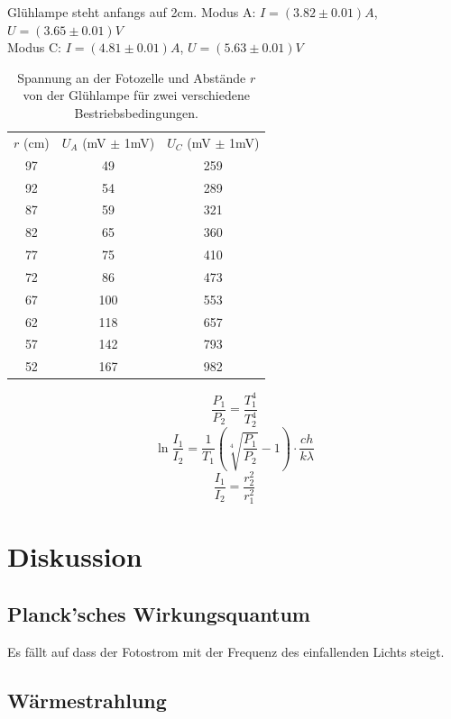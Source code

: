 \documentclass{article}
\begin{document}
Glühlampe steht anfangs auf 2cm.
Modus A: $I=(3.82 \pm 0.01)A$, $U=(3.65 \pm 0.01)V$\\
Modus C: $I=(4.81 \pm 0.01)A$, $U=(5.63 \pm 0.01)V$\\
\begin{table}[H]
\begin{center}
\begin{tabular}{|c|c|c|}
\hline
$r$ (cm) & $U_A$ (mV $\pm$ 1mV) & $U_C$ (mV $\pm$ 1mV)\\
97 & 49 & 259 \\
92 & 54 & 289 \\
87 & 59 & 321 \\
82 & 65 & 360 \\
77 & 75 & 410 \\
72 & 86 & 473 \\
67 & 100 & 553 \\
62 & 118 & 657 \\
57 & 142 & 793 \\
52 & 167 & 982 \\
\hline
\hline
\end{tabular}
\caption{Spannung an der Fotozelle und Abstände $r$ von der Glühlampe für zwei verschiedene Bestriebsbedingungen.}
\end{center}
\end{table}



$$\frac{P_1}{P_2} = \frac{T_1^4}{T_2^4}$$
$$\ln \frac{I_1}{I_2} = \frac{1}{T_1} \left(\sqrt[4]{\frac{P_1}{P_2}}-1\right) \cdot \frac{ch}{k\lambda}$$
$$\frac{I_1}{I_2} = \frac{r_2^2}{r_1^2}$$

\section{Diskussion}
\subsection{Planck'sches Wirkungsquantum}
Es fällt auf dass der Fotostrom mit der Frequenz des einfallenden Lichts steigt.
\subsection{Wärmestrahlung}
																								
\end{document}
